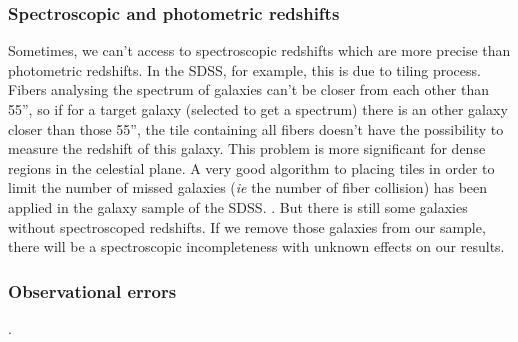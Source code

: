 \subsubsection{Spectroscopic and photometric redshifts}
%
Sometimes, we can't access to spectroscopic redshifts which are more precise
than photometric redshifts. In the SDSS, for example, this is due to tiling
process. Fibers analysing the spectrum of galaxies can't be closer from each
other than 55'', so if for a target galaxy (selected to get a spectrum)
there is an other galaxy closer than those 55'', the tile containing all fibers
doesn't have the possibility to measure the redshift of this galaxy. This
problem is more significant for dense regions in the celestial plane. A very
good algorithm to placing tiles in order to limit the number of missed galaxies
(\textit{ie} the number of fiber collision) has been applied in the galaxy
sample of the SDSS\@.
%
.
%
But there is still some galaxies without spectroscoped
redshifts. If we remove those galaxies from our sample, there will be a
spectroscopic incompleteness with unknown effects on our results.
%
%
\subsubsection{Observational errors}
%
%
.
